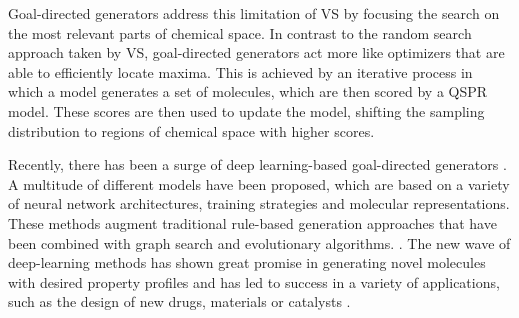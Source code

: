 Goal-directed generators address this limitation of \ac{VS} by focusing the search on the most
relevant parts of chemical space. In contrast to the random search approach taken by \ac{VS},
goal-directed generators act more like optimizers that are able to efficiently locate maxima. This
is achieved by an iterative process in which a model generates a set of molecules, which are then
scored by a \ac{QSPR} model. These scores are then used to update the model, shifting the sampling
distribution to regions of chemical space with higher scores.

Recently, there has been a surge of deep learning-based goal-directed generators
\citep{eltonDeepLearningMolecular2019,sanchez-lengelingInverseMolecularDesign2018,duMachineLearningaidedGenerative2024}.
A multitude of different models have been proposed, which are based on a variety of neural network
architectures, training strategies and molecular representations. These methods augment traditional
rule-based generation approaches that have been combined with graph search and evolutionary
algorithms. \citep{schneiderComputerbasedNovoDesign2005,schneiderNovoMolecularDesign2013}. The new
wave of deep-learning methods has shown great promise in generating novel molecules with desired
property profiles and has led to success in a variety of applications, such as the design of new drugs,
materials or catalysts \citep{todo}.

